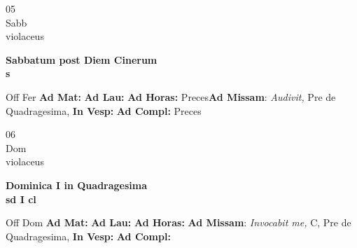 \documentclass[10pt, openany]{book}
\begin{document}
        \begin{center}
            \begin{minipage}{3.5in}
                \vspace{2em}
                \begin{minipage}{0.5in}
                    {\Huge 05} \\
                    {\normalsize Sabb} \\
                    {\normalsize violaceus}
                \end{minipage}
                \begin{minipage}{3.0in}
                    \textbf{ \large Sabbatum post Diem Cinerum \\
                    \textnormal{\normalsize s}} \\ 
                \end{minipage}
                \begin{justify}Off Fer
                    \textbf{Ad Mat: }
                    \textbf{Ad Lau: }
                    \textbf{Ad Horas: }Preces\textbf{Ad Missam}: \textit{Audivit,} Pre de Quadragesima,  
                    \textbf{In Vesp: }
                    \textbf{Ad Compl: }Preces
                \end{justify}
            \end{minipage}
        \end{center}
    
        \begin{center}
            \begin{minipage}{3.5in}
                \vspace{2em}
                \begin{minipage}{0.5in}
                    {\Huge 06} \\
                    {\normalsize Dom} \\
                    {\normalsize violaceus}
                \end{minipage}
                \begin{minipage}{3.0in}
                    \textbf{ \large Dominica I in Quadragesima \\
                    \textnormal{\normalsize sd I cl}} \\ 
                \end{minipage}
                \begin{justify}Off Dom
                    \textbf{Ad Mat: }
                    \textbf{Ad Lau: }
                    \textbf{Ad Horas: }\textbf{Ad Missam}: \textit{Invocabit me,} C, Pre de Quadragesima,  
                    \textbf{In Vesp: }
                    \textbf{Ad Compl: }
                \end{justify}
            \end{minipage}
        \end{center}
    
\end{document}
